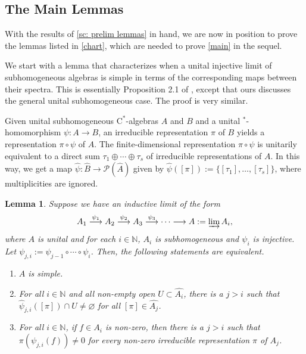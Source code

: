 \documentclass[12pt]{amsart}
\numberwithin{equation}{section}
\newtheorem{lemma}[theorem]{Lemma}
\theoremstyle{definition}
\theoremstyle{remark}
\newcommand{\NN}{\mathbb{N}}
\begin{document}
\subsection{The Main Lemmas}
\label{sc: main lemmas}

With the results of \cref{sc: prelim lemmas} in hand, we are now in position to prove the lemmas listed in \autoref{chart}, which are needed to prove \autoref{main} in the sequel.

We start with a lemma that characterizes when a unital injective limit of subhomogeneous algebras is simple in terms of the corresponding maps between their spectra. This is essentially Proposition 2.1 of \cite{4Rom}, except that ours discusses the general unital subhomogeneous case. The proof is very similar. 


Given unital subhomogeneous $\mathrm{C}^*$-algebras $A$ and $B$ and a unital $^{*}$-homomorphism $\psi\colon A\to B$, an irreducible representation $\pi$ of $B$ yields a representation $\pi\circ\psi$ of $A$. The finite-dimensional representation $\pi\circ\psi$ is unitarily equivalent to a direct sum $\tau_{1}\oplus\cdots\oplus\tau_{s}$ of irreducible representations of $A$. In this way, we get a map $\hat{\psi}\colon\hat{B}\to\mathcal{P}(\hat{A})$ given by $\hat{\psi}([\pi]):=\{[\tau_{1}],\ldots,[\tau_{s}]\}$, where multiplicities are ignored. 

\begin{lemma}
	\label{simplicity}
	Suppose we have an inductive limit of the form 
	$$
	A_{1}\overset{\psi_{1}}{\longrightarrow} A_{2}\overset{\psi_{2}}{\longrightarrow} A_{3}\overset{\psi_{3}}{\longrightarrow}\cdots\longrightarrow A:=\varinjlim A_{i},
	$$
	where $A$ is unital and for each $i\in \NN$, $A_{i}$ is subhomogeneous and $\psi_{i}$ is injective. Let $\psi_{j,i}:=\psi_{j-1}\circ\cdots\circ\psi_{i}$. Then, the following statements are equivalent.
	\begin{enumerate}
		\item $A$ is simple.
		\item For all $i\in\NN$ and all non-empty open $U\subset \hat{A_{i}}$, there is a  $j>i$ such that $\hat{\psi}_{j,i}([\pi])\cap U\not=\varnothing$ for all $[\pi]\in \hat{A_{j}}$.
		\item For all $i\in\NN$, if $f\in A_{i}$ is non-zero, then there is a $j > i$ such that $\pi(\psi_{j,i}(f))\not=0$ for every non-zero irreducible representation $\pi$ of $A_{j}$. 
	\end{enumerate} 
\end{lemma}
\end{document}
